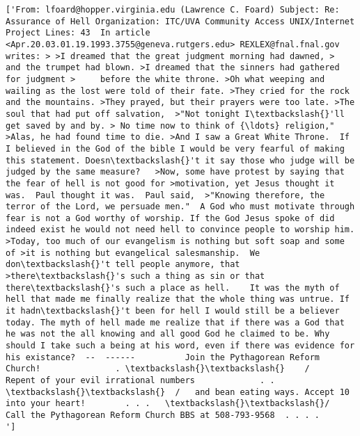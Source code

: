 \documentclass[11pt]{article}
\begin{document}
\begin{Verbatim}[commandchars=\\\{\}]
['From: lfoard@hopper.virginia.edu (Lawrence C. Foard) Subject: Re: Assurance of Hell Organization: ITC/UVA Community Access UNIX/Internet Project Lines: 43  In article <Apr.20.03.01.19.1993.3755@geneva.rutgers.edu> REXLEX@fnal.fnal.gov writes: > >I dreamed that the great judgment morning had dawned, >     and the trumpet had blown. >I dreamed that the sinners had gathered for judgment >     before the white throne. >Oh what weeping and wailing as the lost were told of their fate. >They cried for the rock and the mountains. >They prayed, but their prayers were too late. >The soul that had put off salvation,  >"Not tonight I\textbackslash{}'ll get saved by and by. > No time now to think of {\ldots} religion,"  >Alas, he had found time to die. >And I saw a Great White Throne.  If I believed in the God of the bible I would be very fearful of making this statement. Doesn\textbackslash{}'t it say those who judge will be judged by the same measure?   >Now, some have protest by saying that the fear of hell is not good for >motivation, yet Jesus thought it was.  Paul thought it was.  Paul said,  >"Knowing therefore, the terror of the Lord, we persuade men."  A God who must motivate through fear is not a God worthy of worship. If the God Jesus spoke of did indeed exist he would not need hell to convince people to worship him.  >Today, too much of our evangelism is nothing but soft soap and some of >it is nothing but evangelical salesmanship.  We don\textbackslash{}'t tell people anymore, that >there\textbackslash{}'s such a thing as sin or that there\textbackslash{}'s such a place as hell.    It was the myth of hell that made me finally realize that the whole thing was untrue. If it hadn\textbackslash{}'t been for hell I would still be a believer today. The myth of hell made me realize that if there was a God that he was not the all knowing and all good God he claimed to be. Why should I take such a being at his word, even if there was evidence for his existance?  --  ------          Join the Pythagorean Reform Church!               . \textbackslash{}\textbackslash{}    /        Repent of your evil irrational numbers             . .  \textbackslash{}\textbackslash{}  /   and bean eating ways. Accept 10 into your heart!        . . .   \textbackslash{}\textbackslash{}/   Call the Pythagorean Reform Church BBS at 508-793-9568  . . . .      ']

    \end{Verbatim}
\end{document}
